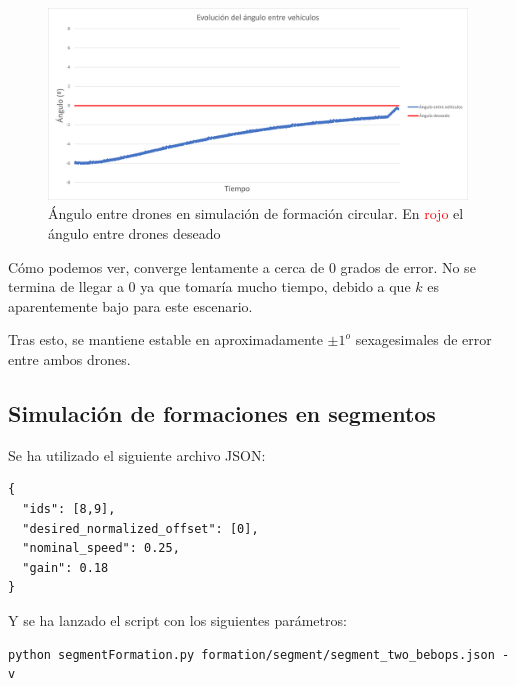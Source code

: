 \begin{figure}[h]
    \centering
    \includegraphics[width=0.99\textwidth]{img/fig/fig4.4-circular-formation-graph-error.png}
    \caption{Ángulo entre drones en simulación de formación circular. 
    En \textcolor{red}{rojo} el ángulo entre drones deseado}
    \label{fig:circular-formation-graph-error}
\end{figure}

Cómo podemos ver, converge lentamente a cerca de 0 grados de error.
No se termina de llegar a 0 ya que tomaría mucho tiempo, debido a que $k$ es aparentemente bajo para este escenario.

Tras esto, se mantiene estable en aproximadamente $\pm 1^o$ sexagesimales de error entre ambos drones.


\subsection{Simulación de formaciones en segmentos}

Se ha utilizado el siguiente archivo JSON:

\begin{lstlisting}[style=CodigoC]
{
  "ids": [8,9],
  "desired_normalized_offset": [0],
  "nominal_speed": 0.25,
  "gain": 0.18
}
\end{lstlisting}

Y se ha lanzado el script con los siguientes parámetros:

\begin{lstlisting}[style=CodigoBash]
python segmentFormation.py formation/segment/segment_two_bebops.json -v
\end{lstlisting}

